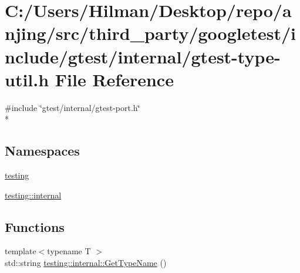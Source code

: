 \hypertarget{gtest-type-util_8h}{}\section{C\+:/\+Users/\+Hilman/\+Desktop/repo/anjing/src/third\+\_\+party/googletest/include/gtest/internal/gtest-\/type-\/util.h File Reference}
\label{gtest-type-util_8h}
{\ttfamily \#include \char`\"{}gtest/internal/gtest-\/port.\+h\char`\"{}}\\*
\subsection*{Namespaces}
\begin{DoxyCompactItemize}
\item 
 \hyperlink{namespacetesting}{testing}
\item 
 \hyperlink{namespacetesting_1_1internal}{testing\+::internal}
\end{DoxyCompactItemize}
\subsection*{Functions}
\begin{DoxyCompactItemize}
\item 
{\footnotesize template$<$typename T $>$ }\\std\+::string \hyperlink{namespacetesting_1_1internal_a635606b4731f843c86ec8ca51cab83a1}{testing\+::internal\+::\+Get\+Type\+Name} ()
\end{DoxyCompactItemize}

